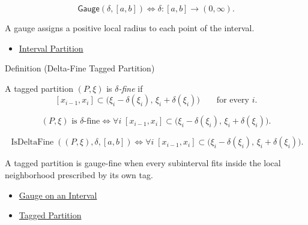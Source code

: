 \begin{remark*}
\[
\mathsf{Gauge}(\delta,[a,b])
\Longleftrightarrow
\delta:[a,b]\to(0,\infty).
\]
\end{remark*}

\begin{remark*}[Interpretation]
A gauge assigns a positive local radius to each point of the interval.
\end{remark*}

\begin{dependencies}
\begin{itemize}
  \item \hyperref[def:interval-partition]{Interval Partition}
\end{itemize}
\end{dependencies}

\begin{definitionbox}{Definition (Delta-Fine Tagged Partition)}
\begin{definition}
\label{def:delta-fine-tagged-partition}
A tagged partition \((P,\xi)\) is \emph{\(\delta\)-fine} if
\[
  [x_{i-1},x_i]\subset
  \bigl(\xi_i-\delta(\xi_i),\,\xi_i+\delta(\xi_i)\bigr)
  \qquad\text{for every }i.
\]
\end{definition}
\end{definitionbox}

\begin{remark*}
\[
(P,\xi)\text{ is }\delta\text{-fine}
\Longleftrightarrow
\forall i\;
[x_{i-1},x_i]\subset
\bigl(\xi_i-\delta(\xi_i),\,\xi_i+\delta(\xi_i)\bigr).
\]
\end{remark*}

\begin{remark*}
\[
\operatorname{IsDeltaFine}((P,\xi),\delta,[a,b])
\Longleftrightarrow
\forall i\;
[x_{i-1},x_i]\subset
\bigl(\xi_i-\delta(\xi_i),\,\xi_i+\delta(\xi_i)\bigr).
\]
\end{remark*}

\begin{remark*}[Interpretation]
A tagged partition is gauge-fine when every subinterval fits inside the local
neighborhood prescribed by its own tag.
\end{remark*}

\begin{dependencies}
\begin{itemize}
  \item \hyperref[def:gauge-on-interval]{Gauge on an Interval}
  \item \hyperref[def:tagged-partition-integration]{Tagged Partition}
\end{itemize}
\end{dependencies}

